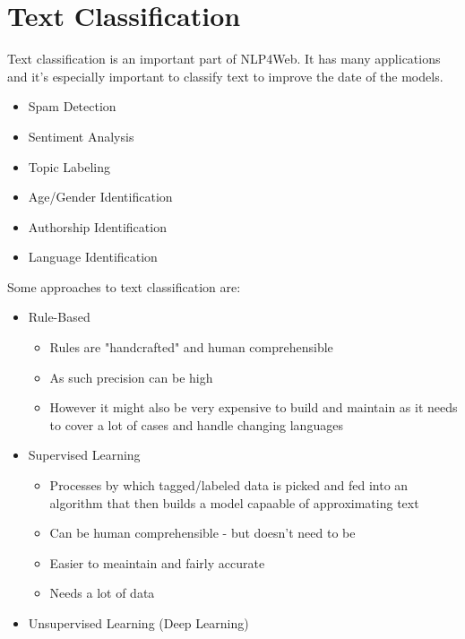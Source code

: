 \documentclass[
../../NLP4W_Summary.tex,
]
{subfiles}
\begin{document}
\section{Text Classification}
Text classification is an important part of NLP4Web. It has many applications and it's especially important to classify text to improve the date of the models.

\begin{greenbox}
    \begin{itemize}
        \item Spam Detection
        \item Sentiment Analysis
        \item Topic Labeling
        \item Age/Gender Identification
        \item Authorship Identification
        \item Language Identification
    \end{itemize}
\end{greenbox}

Some approaches to text classification are:

\begin{greenbox}
    \begin{itemize}
        \item Rule-Based
        \begin{itemize}
            \item Rules are "handcrafted" and human comprehensible
            \item As such precision can be high
            \item However it might also be very expensive to build and maintain as it needs to cover a lot of cases and handle changing languages
        \end{itemize}
        \item Supervised Learning
        \begin{itemize}
            \item Processes by which tagged/labeled data is picked and fed into an algorithm that then builds a model capaable of approximating text
            \item Can be human comprehensible - but doesn't need to be
            \item Easier to meaintain and fairly accurate
            \item Needs a lot of data
        \end{itemize}
        \item Unsupervised Learning (Deep Learning)
    \end{itemize}
\end{greenbox}
\end{document}

